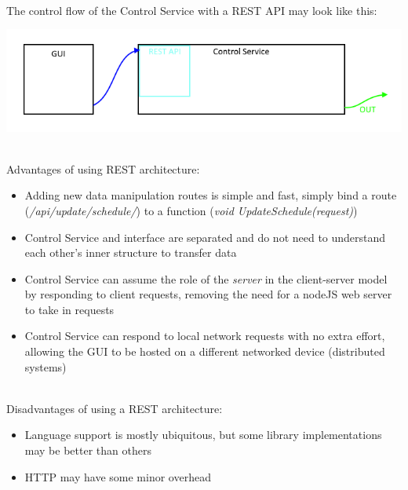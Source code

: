 		\noindent \\The control flow of the Control Service with a REST API may look like this:

		\includegraphics[width=\linewidth]{RESTDiag.png}

		\noindent \\Advantages of using REST architecture:
		\begin{itemize}
			\item Adding new data manipulation routes is simple and fast, simply bind a route (\textit{/api/update/schedule/}) to a function (\textit{void UpdateSchedule(request)})
			\item Control Service and interface are separated and do not need to understand each other's inner structure to transfer data
			\item Control Service can assume the role of the \textit{server} in the client-server model by responding to client requests, removing the need for a nodeJS web server to take in requests
			\item Control Service can respond to local network requests with no extra effort, allowing the GUI to be hosted on a different networked device (distributed systems)
		\end{itemize}

		\noindent \\Disadvantages of using a REST architecture:
		\begin{itemize}
			\item Language support is mostly ubiquitous, but some library implementations may be better than others
			\item HTTP may have some minor overhead
		\end{itemize}


